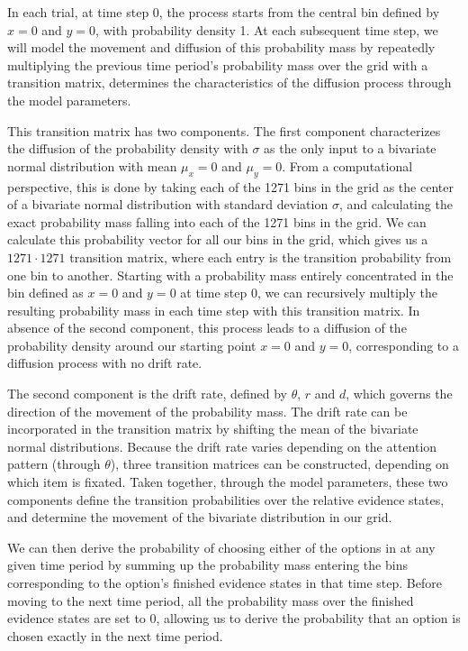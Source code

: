 \documentclass[11pt,a4paper]{article}
\begin{document}
In each trial, at time step 0, the process starts from the central bin defined by $x = 0$ and $y = 0$, with probability density 1. At each subsequent time step, we will model the movement and diffusion of this probability mass by repeatedly multiplying the previous time period's probability mass over the grid with a transition matrix, determines the characteristics of the diffusion process through the model parameters. 

This transition matrix has two components. The first component characterizes the diffusion of the probability density with $\sigma$ as the only input to a bivariate normal distribution with mean $\mu_x=0$ and $\mu_y=0$. From a computational perspective, this is done by taking each of the 1271 bins in the grid as the center of a bivariate normal distribution with standard deviation $\sigma$, and calculating the exact probability mass falling into each of the 1271 bins in the grid. We can calculate this probability vector for all our bins in the grid, which gives us a $1271\cdot1271$ transition matrix, where each entry is the transition probability from one bin to another. Starting with a probability mass entirely concentrated in the bin defined as $x = 0$ and $y = 0$ at time step 0, we can recursively multiply the resulting probability mass in each time step with this transition matrix. In absence of the second component, this process leads to a diffusion of the probability density around our starting point $x = 0$ and $y = 0$, corresponding to a diffusion process with no drift rate. 

The second component is the drift rate, defined by $\theta$, $r$ and $d$, which governs the direction of the movement of the probability mass. The drift rate can be incorporated in the transition matrix by shifting the mean of the bivariate normal distributions. Because the drift rate varies depending on the attention pattern (through $\theta$), three transition matrices can be constructed, depending on which item is fixated. Taken together, through the model parameters, these two components define the transition probabilities over the relative evidence states, and determine the movement of the bivariate distribution in our grid.

We can then derive the probability of choosing either of the options in at any given time period by summing up the probability mass entering the bins corresponding to the option's finished evidence states in that time step. Before moving to the next time period, all the probability mass over the finished evidence states are set to 0, allowing us to derive the probability that an option is chosen exactly in the next time period.
\end{document}
